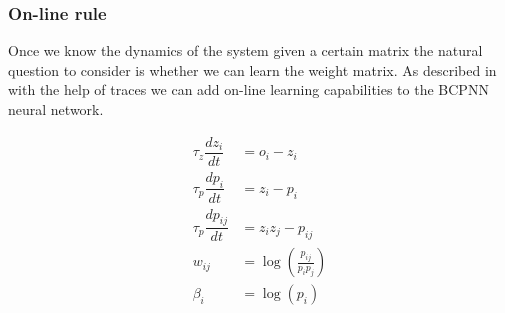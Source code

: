 \documentclass[10pt,a4paper]{article}
\begin{document}
\subsubsection{On-line rule}
Once we know the dynamics of the system given a certain matrix the natural question to consider is whether we can learn the weight matrix. As described in \cite{sandberg2002bayesian} with the help of traces we can add on-line learning capabilities to the BCPNN neural network. 

\begin{align}
\tau_z \dfrac{dz_i}{dt} &= o_i - z_i \label{eq:traces}\\
\tau_p \dfrac{dp_i}{dt} &= z_i - p_i  \label{eq:traces_probability} \\  
\tau_p \dfrac{dp_{ij}}{dt} &= z_i z_j - p_{ij} \\
w_{ij} &= \log(\frac{p_{ij}}{p_i p_j}) \label{eq:bcpnn_weight_update} \\
\beta_i &= \log(p_i) 
\end{align}
\end{document}
